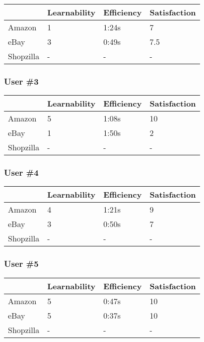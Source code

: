 \documentclass[11pt, oneside]{article}
\begin{document}
\begin{center}
\begin{tabular}{| l | l | l | l |}
    \hline
     & Learnability & Efficiency & Satisfaction \\ \hline
    Amazon & 1 & 1:24s & 7 \\ \hline
    eBay & 3 & 0:49s & 7.5 \\ \hline
    Shopzilla & - & - & - \\\hline
\end{tabular}
\end{center}

\subsubsection{User \#3}

\begin{center}
\begin{tabular}{| l | l | l | l |}
    \hline
     & Learnability & Efficiency & Satisfaction \\ \hline
    Amazon & 5 & 1:08s & 10 \\ \hline
    eBay & 1 & 1:50s & 2 \\ \hline
    Shopzilla & - & - & - \\\hline
\end{tabular}
\end{center}

\subsubsection{User \#4}

\begin{center}
\begin{tabular}{| l | l | l | l |}
    \hline
     & Learnability & Efficiency & Satisfaction \\ \hline
    Amazon & 4 & 1:21s & 9 \\ \hline
    eBay & 3 & 0:50s & 7 \\ \hline
    Shopzilla & - & - & - \\\hline
\end{tabular}
\end{center}

\subsubsection{User \#5}

\begin{center}
\begin{tabular}{| l | l | l | l |}
    \hline
     & Learnability & Efficiency & Satisfaction \\ \hline
    Amazon & 5 & 0:47s & 10 \\ \hline
    eBay & 5 & 0:37s & 10 \\ \hline
    Shopzilla & - & - & - \\\hline
\end{tabular}
\end{center}
\end{document}
